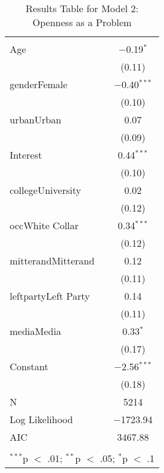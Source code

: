 
\begin{table}[!htbp] \centering 
  \caption{Results Table for Model 2: Openness as a Problem} 
  \label{} 
\footnotesize 
\begin{tabular}{@{\extracolsep{5pt}}lc} 
\\[-1.8ex]\hline \\[-1.8ex] 
\hline \\[-1.8ex] 
 Age & $-$0.19$^{*}$ \\ 
  & (0.11) \\ 
  genderFemale & $-$0.40$^{***}$ \\ 
  & (0.10) \\ 
  urbanUrban & 0.07 \\ 
  & (0.09) \\ 
  Interest & 0.44$^{***}$ \\ 
  & (0.10) \\ 
  collegeUniversity & 0.02 \\ 
  & (0.12) \\ 
  occWhite Collar & 0.34$^{***}$ \\ 
  & (0.12) \\ 
  mitterandMitterand & 0.12 \\ 
  & (0.11) \\ 
  leftpartyLeft Party & 0.14 \\ 
  & (0.11) \\ 
  mediaMedia & 0.33$^{*}$ \\ 
  & (0.17) \\ 
  Constant & $-$2.56$^{***}$ \\ 
  & (0.18) \\ 
 N & 5214 \\ 
Log Likelihood & $-$1723.94 \\ 
AIC & 3467.88 \\ 
\hline \\[-1.8ex] 
\multicolumn{2}{l}{$^{***}$p $<$ .01; $^{**}$p $<$ .05; $^{*}$p $<$ .1} \\ 
\end{tabular} 
\end{table} 

